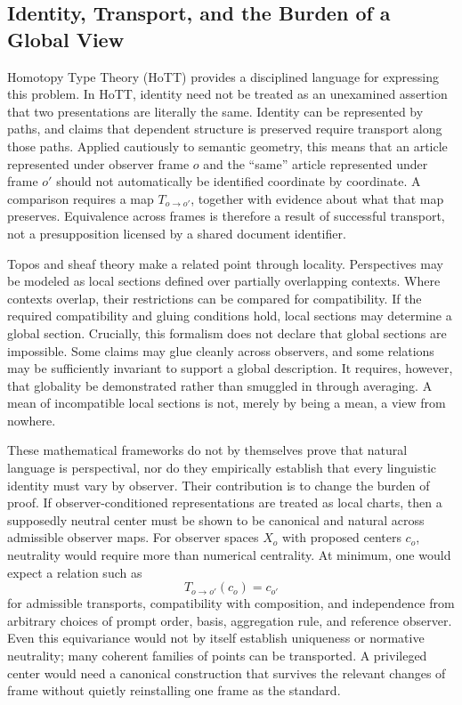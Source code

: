 \subsection{Identity, Transport, and the Burden of a Global View}

Homotopy Type Theory (HoTT) provides a disciplined language for expressing this problem. In HoTT, identity need not be treated as an unexamined assertion that two presentations are literally the same. Identity can be represented by paths, and claims that dependent structure is preserved require transport along those paths. Applied cautiously to semantic geometry, this means that an article represented under observer frame $o$ and the ``same'' article represented under frame $o'$ should not automatically be identified coordinate by coordinate. A comparison requires a map $T_{o\to o'}$, together with evidence about what that map preserves. Equivalence across frames is therefore a result of successful transport, not a presupposition licensed by a shared document identifier.

Topos and sheaf theory make a related point through locality. Perspectives may be modeled as local sections defined over partially overlapping contexts. Where contexts overlap, their restrictions can be compared for compatibility. If the required compatibility and gluing conditions hold, local sections may determine a global section. Crucially, this formalism does not declare that global sections are impossible. Some claims may glue cleanly across observers, and some relations may be sufficiently invariant to support a global description. It requires, however, that globality be demonstrated rather than smuggled in through averaging. A mean of incompatible local sections is not, merely by being a mean, a view from nowhere.

These mathematical frameworks do not by themselves prove that natural language is perspectival, nor do they empirically establish that every linguistic identity must vary by observer. Their contribution is to change the burden of proof. If observer-conditioned representations are treated as local charts, then a supposedly neutral center must be shown to be canonical and natural across admissible observer maps. For observer spaces $X_o$ with proposed centers $c_o$, neutrality would require more than numerical centrality. At minimum, one would expect a relation such as
\begin{equation}
T_{o\to o'}(c_o)=c_{o'}
\end{equation}
for admissible transports, compatibility with composition, and independence from arbitrary choices of prompt order, basis, aggregation rule, and reference observer. Even this equivariance would not by itself establish uniqueness or normative neutrality; many coherent families of points can be transported. A privileged center would need a canonical construction that survives the relevant changes of frame without quietly reinstalling one frame as the standard.

